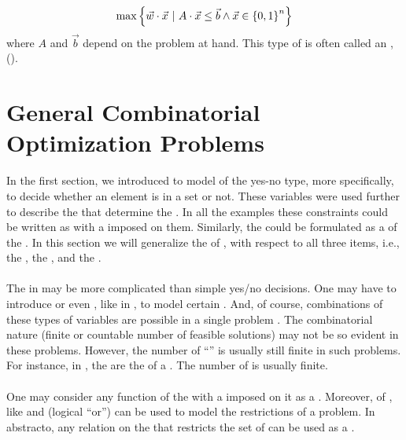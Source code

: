 \begin{definition}
\begin{equation}
\max\left\{ \vec{w}\cdot\vec{x}\ |\ A\cdot\vec{x}\leq\vec{b}\wedge \vec{x}\in\left\{ 0,1 \right\}^n \right\}
\end{equation}
where $A$ and $\vec{b}$ depend on the problem at hand. This type of  is often called an , ().

\section{General Combinatorial Optimization Problems}

In the first section, we introduced  to model  of the yes-no type, more specifically, to decide whether an element is in a set or not. These variables were used further to describe the  that determine the . In all the examples these constraints could be written as  with a  imposed on them. Similarly, the  could be formulated as a  of the . In this section we will generalize the  of , with respect to all three items, i.e., the , the , and the .

\paragraph{}
The  in  may be more complicated than simple yes/no decisions. One may have to introduce  or even , like in , to model certain . And, of course, combinations of these types of variables are possible in a single problem . The combinatorial nature (finite or countable number of feasible solutions) may not be so evident in these problems. However, the number of ``'' is usually still finite in such problems. For instance, in , the  are the  of a . The number of  is usually finite.

\paragraph{}
One may consider any function of the  with a  imposed on it as a . Moreover,  of , like  and  (logical ``or'') can be used to model the restrictions of a problem. In abstracto, any relation on the  that restricts the set of  can be used as a .


\end{definition}
